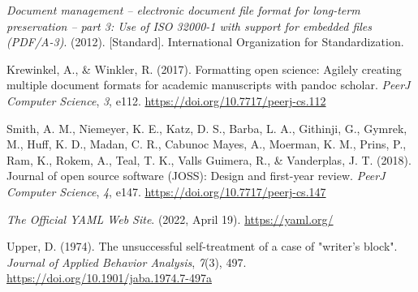 \documentclass[10pt,a4paper,onecolumn]{article}
\newlength{\cslhangindent}
\newenvironment{CSLReferences}[2] %
 {\begin{list}{}{%
  \setlength{\itemindent}{0pt}
  \setlength{\leftmargin}{0pt}
  \setlength{\parsep}{0pt}
  \ifodd #1
   \setlength{\leftmargin}{\cslhangindent}
   \setlength{\itemindent}{-1\cslhangindent}
  \fi
  \setlength{\itemsep}{#2\baselineskip}}}
 {\end{list}}
\begin{document}
\label{refs}
\begin{CSLReferences}{1}{0.5}
\emph{Document management -- electronic document file format for
long-term preservation -- part 3: Use of {ISO} 32000-1 with support for
embedded files ({PDF/A-3})}. (2012). {[}Standard{]}. International
Organization for Standardization.

Krewinkel, A., \& Winkler, R. (2017). Formatting open science: Agilely
creating multiple document formats for academic manuscripts with pandoc
scholar. \emph{PeerJ Computer Science}, \emph{3}, e112.
\url{https://doi.org/10.7717/peerj-cs.112}

Smith, A. M., Niemeyer, K. E., Katz, D. S., Barba, L. A., Githinji, G.,
Gymrek, M., Huff, K. D., Madan, C. R., Cabunoc Mayes, A., Moerman, K.
M., Prins, P., Ram, K., Rokem, A., Teal, T. K., Valls Guimera, R., \&
Vanderplas, J. T. (2018). Journal of open source software (JOSS): Design
and first-year review. \emph{PeerJ Computer Science}, \emph{4}, e147.
\url{https://doi.org/10.7717/peerj-cs.147}

\emph{The {Official YAML Web Site}}. (2022, April 19).
\url{https://yaml.org/}

Upper, D. (1974). The unsuccessful self-treatment of a case of "writer's
block". \emph{Journal of Applied Behavior Analysis}, \emph{7}(3), 497.
\url{https://doi.org/10.1901/jaba.1974.7-497a}

\end{CSLReferences}
\end{document}
